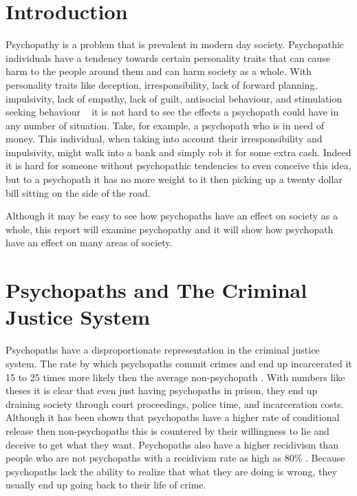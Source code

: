 \documentclass[12pt,jou]{apa}
\begin{document}


\tableofcontents                  
\newpage
{}
\pagestyle{fancy}
\fancyhf{}
\fancyhead[R]{\thepage}

\section{Introduction}
Psychopathy is a problem that is prevalent in modern day society. Psychopathic individuals have a tendency towards certain personality traits that can cause harm to the people around them and can harm society as a whole. With personality traits like deception, irresponsibility, lack of forward planning, impulsivity, lack of empathy, lack of guilt, antisocial behaviour, and stimulation seeking behaviour ~\cite{brazil} it is not hard to see the effects a psychopath could have in any number of situation. Take, for example, a psychopath who is in need of money. This individual, when taking into account their irresponsibility and impulsivity,  might walk into a bank and simply rob it for some extra cash. Indeed it is hard for someone without psychopathic tendencies to even conceive this idea, but to a psychopath it has no more weight to it then picking up a twenty dollar bill sitting on the side of the road. 

Although it may be easy to see how psychopaths have an effect on society as a whole, this report will examine psychopathy and it will show how psychopath have an effect on many areas of society. 

\section{Psychopaths and The Criminal Justice System}
Psychopaths have a disproportionate representation in the criminal justice system. The rate by which psychopaths commit crimes and end up incarcerated it 15 to 25 times more likely then the average non-psychopath \cite{crimpsych}. With numbers like theses it is clear that even just having psychopaths in prison, they end up draining society through court proceedings, police time, and incarceration costs. Although it has been shown that psychopaths have a higher rate of conditional release then non-psychopaths \cite{crimpsych} this is countered by their willingness to lie and deceive to get what they want. Psychopaths also have a higher recidivism than people who are not psychopaths with a recidivism rate as high as 80\% \cite{crimpsych}. Because psychopaths lack the ability to realize that what they are doing is wrong, they usually end up going back to their life of crime.   
\end{document}
